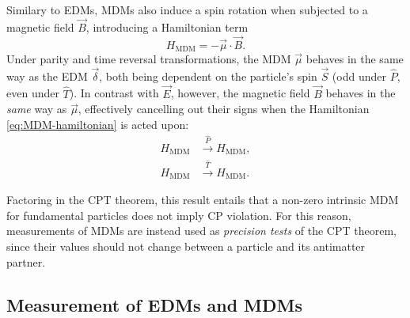 Similary to EDMs, MDMs also induce a spin rotation when subjected to a magnetic field $\vec{B}$, introducing a Hamiltonian term
\begin{equation}
H_\text{MDM} = - \vec{\mu} \cdot \vec{B} .
\label{eq:MDM-hamiltonian}
\end{equation}
Under parity and time reversal transformations, the MDM $\vec{\mu}$ behaves in the same way as the EDM $\vec{\delta}$, both being dependent on the particle's spin $\vec{S}$ (odd under $\hat{P}$, even under $\hat{T}$).
In contrast with $\vec{E}$, however, the magnetic field $\vec{B}$ behaves in the \textit{same} way as $\vec{\mu}$, effectively cancelling out their signs when the Hamiltonian \eqref{eq:MDM-hamiltonian} is acted upon:
\begin{align}
H_\text{MDM} &\xrightarrow{\hat{P}} H_\text{MDM},
\label{eq:MDM-hamiltonian-under-P} \\
H_\text{MDM} &\xrightarrow{\hat{T}} H_\text{MDM}.
\label{eq:MDM-hamiltonian-under-T}
\end{align}

Factoring in the CPT theorem, this result entails that a non-zero intrinsic MDM for fundamental particles does not imply CP violation.
For this reason, measurements of MDMs are instead used as \textit{precision tests} of the CPT theorem, since their values should not change between a particle and its antimatter partner.

\subsection{Measurement of EDMs and MDMs}
\label{sec:emdm-measurement}


